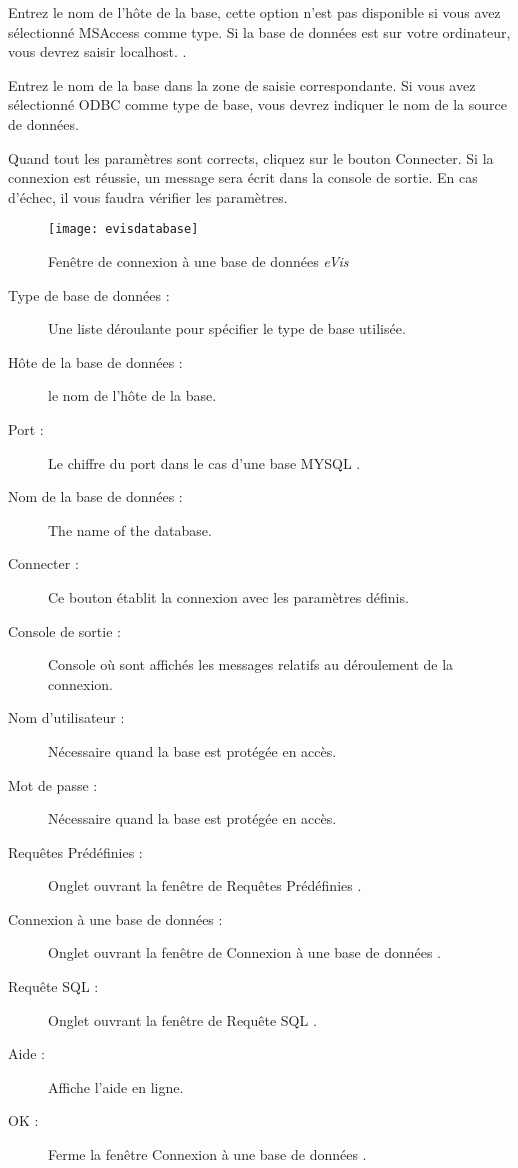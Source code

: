 Entrez le nom de l'hôte de la base, cette option n'est pas disponible si vous avez sélectionné MSAccess  comme type. Si la base de données est sur votre ordinateur, vous devrez saisir localhost. .


Entrez le nom de la base dans la zone de saisie correspondante. Si vous avez sélectionné ODBC  comme type de base, vous devrez indiquer le nom de la source de données.


Quand tout les paramètres sont corrects, cliquez sur le bouton Connecter. Si la connexion est réussie, un message sera écrit dans la console de sortie. En cas d'échec, il vous faudra vérifier les paramètres.

\begin{figure}[ht]
   \begin{center}
\texttt{[image: evisdatabase]}
\caption{Fenêtre de connexion à une base de données \emph{eVis} \nixcaption}\label{evisdatabase}
\end{center}
\end{figure}

\begin{description}
\item[Type de base de données :] Une liste déroulante pour spécifier le type de base utilisée.
\item[Hôte de la base de données :] le nom de l'hôte de la base.
\item[Port :] Le chiffre du port dans le cas d'une base MYSQL .
\item[Nom de la base de données :] The name of the database.
\item[Connecter :] Ce bouton établit la connexion avec les paramètres définis.
\item[Console de sortie :] Console où sont affichés les messages relatifs au déroulement de la connexion.
\item[Nom d'utilisateur :] Nécessaire quand la base est protégée en accès.
\item[Mot de passe :] Nécessaire quand la base est protégée en accès.
\item[Requêtes Prédéfinies :]  Onglet ouvrant la fenêtre de Requêtes Prédéfinies .
\item[Connexion à une base de données :] Onglet ouvrant la fenêtre de Connexion à une base de données .
\item[Requête SQL :] Onglet ouvrant la fenêtre de Requête SQL .
\item[Aide :] Affiche l'aide en ligne.
\item[OK :] Ferme la fenêtre Connexion à une base de données .
\end{description}

